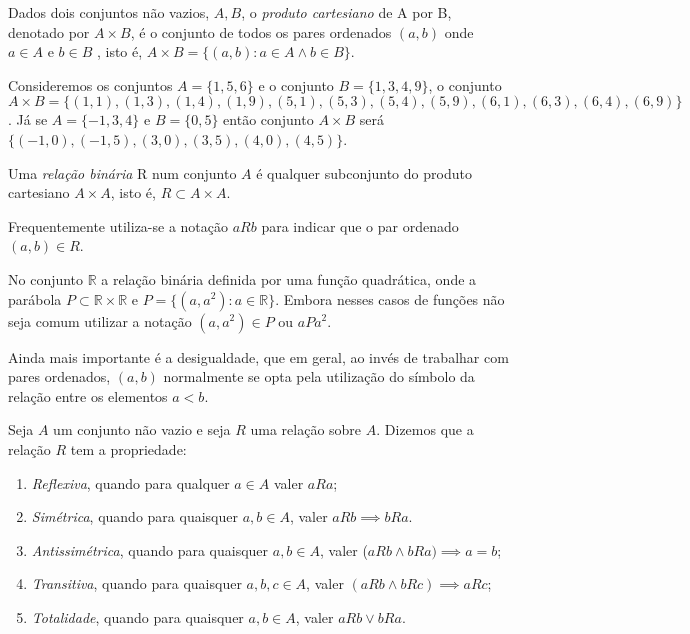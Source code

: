 \documentclass[../main.tex]{subfiles}
\begin{document}
\begin{defi}\label{agb-def-prodCart}
     Dados dois conjuntos não vazios, $A,B$, o \emph{produto cartesiano} de A por B, denotado por $A \times B$, é o conjunto de todos os pares ordenados $(a,b)$ onde $a \in A$ e $b \in B$ , isto é, $A \times B = \{ (a,b) : a \in A \land b \in B \}$.
\end{defi}
\begin{ex}
    Consideremos os conjuntos $A = \{1,5,6\}$ e o conjunto $B = \{1,3,4,9\}$, o conjunto $A \times B = \{(1,1), (1,3), (1,4), (1,9), (5,1), (5,3), (5,4), (5,9), (6,1), (6,3), (6,4), (6,9)\}$. Já se $A = \{-1,3,4\}$ e $B = \{0,5\}$ então conjunto $A \times B$ será $\{(-1,0), (-1,5), (3,0), (3,5), (4,0), (4,5)\}$.
\end{ex}
    

\begin{defi}\label{agb-def-relBin}
    Uma \emph{relação binária} R num conjunto $A$ é qualquer subconjunto do produto cartesiano $A \times A$, isto é, $R \subset A \times A$.
\end{defi}

Frequentemente utiliza-se a notação $aRb$ para indicar que o par ordenado $(a,b) \in R$.

\begin{ex}
    No conjunto $\mathbb{R}$ a relação binária definida por uma função quadrática, onde a parábola $P \subset \mathbb{R} \times \mathbb{R}$ e $P = \{(a,a^2) : a \in \mathbb{R} \}$. Embora nesses casos de funções não seja comum utilizar a notação $(a,a^2) \in P$ ou $a P a^2$.    
\end{ex}
\begin{ex}
    Ainda mais importante é a desigualdade, que em geral, ao invés de trabalhar com pares ordenados, $(a,b)$ normalmente se opta pela utilização do símbolo da relação entre os elementos $a<b$.     
\end{ex}

\begin{defi}
    Seja $A$ um conjunto não vazio e seja $R$ uma relação sobre $A$. Dizemos que a relação $R$ tem a propriedade:
    \begin{enumerate}[label=(\roman*)]
        \item \emph{Reflexiva}, quando para qualquer $a \in A$ valer $aRa$;
        \item \emph{Simétrica}, quando para quaisquer $a,b \in A$, valer $aRb \implies bRa$.
        \item \emph{Antissimétrica}, quando para quaisquer $a,b \in A$, valer ($a R b \land bRa) \implies a = b$;
        \item \emph{Transitiva}, quando para quaisquer $a,b,c \in A$, valer $(aRb \land bRc) \implies aRc$;
        \item \emph{Totalidade}, quando para quaisquer $a,b \in A$, valer $aRb \lor bRa$.
    \end{enumerate}
\end{defi}
\end{document}
